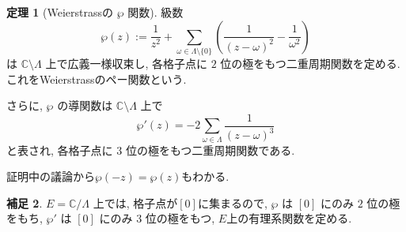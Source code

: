 \documentclass[dvipdfmx,a4paper,11pt]{article} %
\newcommand{\C}{\mathbb{C}}
\theoremstyle{definition}
\newtheorem{thm}{定理}[section]
\numberwithin{equation}{section}
\newtheorem{rem}[thm]{補足}
\begin{document}
\begin{thm}[Weierstrassの $\wp$ 関数]\label{O-M142}
級数
\[
\wp(z):=\frac{1}{z^2}
+\sum_{\omega\in\Lambda\setminus\{0\}}
\left(
\frac{1}{(z-\omega)^2}-\frac{1}{\omega^2}
\right)
\]
は $\C\setminus\Lambda$ 上で広義一様収束し, 
各格子点に $2$ 位の極をもつ二重周期関数を定める.
これをWeierstrassのペー関数という.

さらに, $\wp$ の導関数は $\C\setminus\Lambda$ 上で
\[
\wp'(z)=-2\sum_{\omega\in\Lambda}\frac1{(z-\omega)^3}
\]
と表され, 各格子点に $3$ 位の極をもつ二重周期関数である.
\end{thm}
証明中の議論から$\wp(-z)=\wp(z)$もわかる. 

\begin{rem}\label{O-M144}
$E=\C/\Lambda$ 上では, 格子点が$[0]$に集まるので, 
$\wp$ は $[0]$ にのみ $2$ 位の極をもち, 
$\wp'$ は $[0]$ にのみ $3$ 位の極をもつ, $E$上の有理系関数を定める. 
\end{rem}
\end{document}
